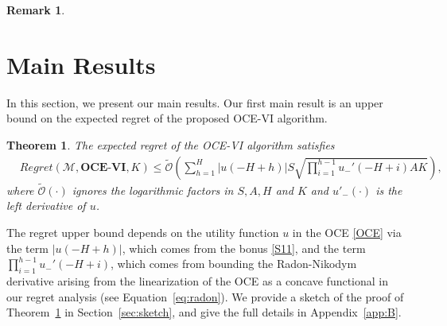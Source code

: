 \documentclass[11pt]{article}
\newtheorem{theorem}{Theorem}
\newtheorem{remark}{Remark}
\newcommand{\1}{\mathbbm{1}}
\newcommand{\gao}[1]{\textcolor{blue}{{#1}}} %
\begin{document}
\begin{remark}

\end{remark}

\section{Main Results}\label{sec:results}
In this section, we present our main results. Our first main result is an upper bound
on the expected regret of the proposed OCE-VI algorithm. 



\begin{theorem}\label{THM1}
The expected regret of the OCE-VI algorithm satisfies
\begin{align*}
&Regret(\mathcal{M},\textbf{OCE-VI},K)\leq \tilde{\mathcal{O}}\left(\sum_{h=1}^H\vert u(-H+h)\vert S\sqrt{\prod\limits_{i=1}^{h-1} u_{-}'(-H+i)AK}\right),
\end{align*}
where 
$\tilde{\mathcal{O}}(\cdot)$ ignores the logarithmic factors in $S,A,H$ and $K$ and $u'_{-}(\cdot)$ is the left derivative of $u$.
\end{theorem} 
 The regret upper bound depends on the utility function $u$ in the OCE \eqref{OCE} via the term $\vert u(-H+h)\vert$, which comes from the bonus \eqref{S11}, and the term $\prod\limits_{i=1}^{h-1} u_{-}'(-H+i)$, which comes from bounding the Radon-Nikodym derivative arising from the linearization of the OCE as a concave functional in our regret analysis (see Equation~\eqref{eq:radon}). 
 We provide a sketch of the proof of Theorem~\ref{THM1} in Section~\ref{sec:sketch}, and give the full details in Appendix~\ref{app:B}. 
\end{document}
